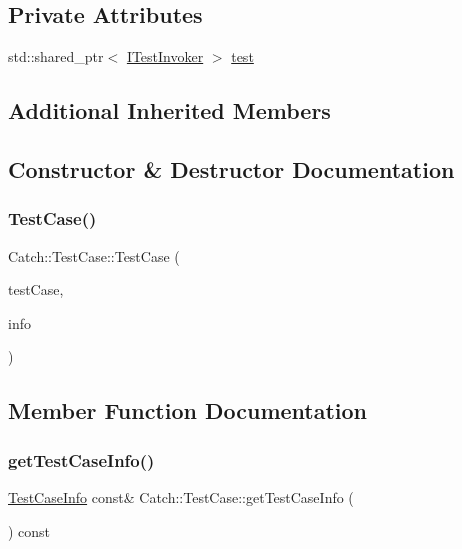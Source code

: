 \subsection*{Private Attributes}
\begin{DoxyCompactItemize}
\item 
std\+::shared\+\_\+ptr$<$ \mbox{\hyperlink{struct_catch_1_1_i_test_invoker}{I\+Test\+Invoker}} $>$ \mbox{\hyperlink{class_catch_1_1_test_case_a7aaa375d6f2bda735095eaa43395b54b}{test}}
\end{DoxyCompactItemize}
\subsection*{Additional Inherited Members}


\subsection{Constructor \& Destructor Documentation}
\mbox{\label{class_catch_1_1_test_case_aae5709fc1cb68e19ab0ac27e1ffd6a76}} 
\subsubsection{\texorpdfstring{TestCase()}{TestCase()}}
{\footnotesize\ttfamily Catch\+::\+Test\+Case\+::\+Test\+Case (\begin{DoxyParamCaption}\item[{\mbox{\hyperlink{struct_catch_1_1_i_test_invoker}{I\+Test\+Invoker}} $\ast$}]{test\+Case,  }\item[{\mbox{\hyperlink{struct_catch_1_1_test_case_info}{Test\+Case\+Info}} \&\&}]{info }\end{DoxyParamCaption})}



\subsection{Member Function Documentation}
\mbox{\label{class_catch_1_1_test_case_a1ea0d79f49156cebea076fe1ba50d2b6}} 
\subsubsection{\texorpdfstring{getTestCaseInfo()}{getTestCaseInfo()}}
{\footnotesize\ttfamily \mbox{\hyperlink{struct_catch_1_1_test_case_info}{Test\+Case\+Info}} const\& Catch\+::\+Test\+Case\+::get\+Test\+Case\+Info (\begin{DoxyParamCaption}{ }\end{DoxyParamCaption}) const}

